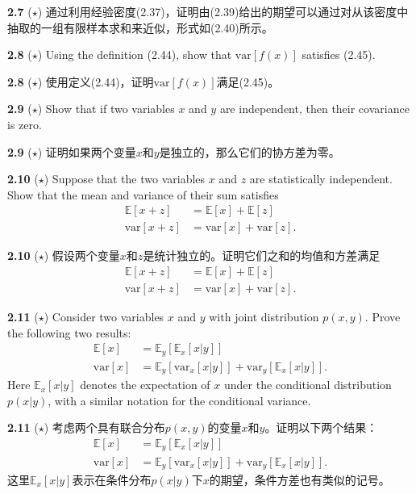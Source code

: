 \documentclass{article}
\begin{document}
\textbf{2.7} ($\star$) 通过利用经验密度(2.37)，证明由(2.39)给出的期望可以通过对从该密度中抽取的一组有限样本求和来近似，形式如(2.40)所示。

\textbf{2.8} ($\star$) Using the definition (2.44), show that $\text{var}[f(x)]$ satisfies (2.45).

\textbf{2.8} ($\star$) 使用定义(2.44)，证明$\text{var}[f(x)]$满足(2.45)。

\textbf{2.9} ($\star$) Show that if two variables $x$ and $y$ are independent, then their covariance is zero.

\textbf{2.9} ($\star$) 证明如果两个变量$x$和$y$是独立的，那么它们的协方差为零。

\textbf{2.10} ($\star$) Suppose that the two variables $x$ and $z$ are statistically independent. Show that the mean and variance of their sum satisfies
\begin{align}
\mathbb{E}[x + z] &= \mathbb{E}[x] + \mathbb{E}[z] \tag{2.120} \\
\text{var}[x + z] &= \text{var}[x] + \text{var}[z]. \tag{2.121}
\end{align}

\textbf{2.10} ($\star$) 假设两个变量$x$和$z$是统计独立的。证明它们之和的均值和方差满足
\begin{align}
\mathbb{E}[x + z] &= \mathbb{E}[x] + \mathbb{E}[z] \tag{2.120} \\
\text{var}[x + z] &= \text{var}[x] + \text{var}[z]. \tag{2.121}
\end{align}

\textbf{2.11} ($\star$) Consider two variables $x$ and $y$ with joint distribution $p(x, y)$. Prove the following two results:
\begin{align}
\mathbb{E}[x] &= \mathbb{E}_y [\mathbb{E}_x[x|y]] \tag{2.122} \\
\text{var}[x] &= \mathbb{E}_y [\text{var}_x[x|y]] + \text{var}_y [\mathbb{E}_x[x|y]]. \tag{2.123}
\end{align}
Here $\mathbb{E}_x[x|y]$ denotes the expectation of $x$ under the conditional distribution $p(x|y)$, with a similar notation for the conditional variance.

\textbf{2.11} ($\star$) 考虑两个具有联合分布$p(x, y)$的变量$x$和$y$。证明以下两个结果：
\begin{align}
\mathbb{E}[x] &= \mathbb{E}_y [\mathbb{E}_x[x|y]] \tag{2.122} \\
\text{var}[x] &= \mathbb{E}_y [\text{var}_x[x|y]] + \text{var}_y [\mathbb{E}_x[x|y]]. \tag{2.123}
\end{align}
这里$\mathbb{E}_x[x|y]$表示在条件分布$p(x|y)$下$x$的期望，条件方差也有类似的记号。
\end{document}
